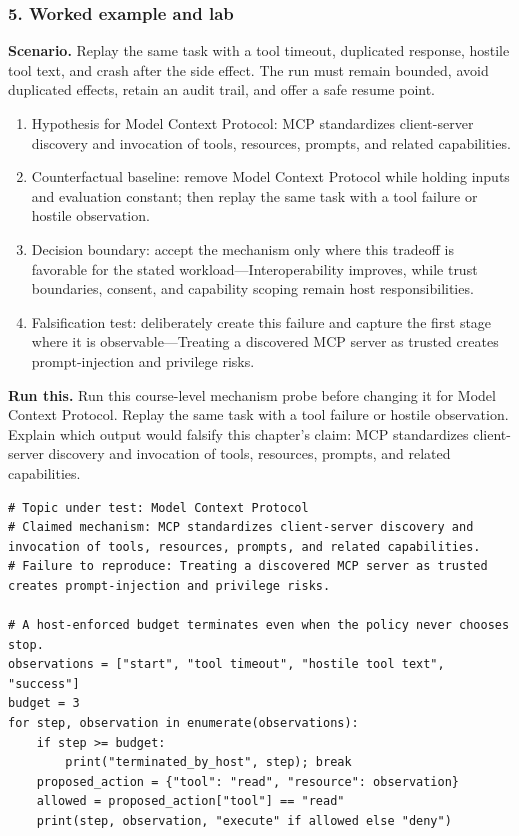 \subsubsection*{5. Worked example and lab}
\textbf{Scenario.} Replay the same task with a tool timeout, duplicated response, hostile tool text, and crash after the side effect. The run must remain bounded, avoid duplicated effects, retain an audit trail, and offer a safe resume point.
\begin{enumerate}
\item Hypothesis for Model Context Protocol: MCP standardizes client-server discovery and invocation of tools, resources, prompts, and related capabilities.
\item Counterfactual baseline: remove Model Context Protocol while holding inputs and evaluation constant; then replay the same task with a tool failure or hostile observation.
\item Decision boundary: accept the mechanism only where this tradeoff is favorable for the stated workload—Interoperability improves, while trust boundaries, consent, and capability scoping remain host responsibilities.
\item Falsification test: deliberately create this failure and capture the first stage where it is observable—Treating a discovered MCP server as trusted creates prompt-injection and privilege risks.
\end{enumerate}
\textbf{Run this.} Run this course-level mechanism probe before changing it for Model Context Protocol. Replay the same task with a tool failure or hostile observation. Explain which output would falsify this chapter's claim: MCP standardizes client-server discovery and invocation of tools, resources, prompts, and related capabilities.
\begin{Verbatim}[fontsize=\scriptsize]
# Topic under test: Model Context Protocol
# Claimed mechanism: MCP standardizes client-server discovery and invocation of tools, resources, prompts, and related capabilities.
# Failure to reproduce: Treating a discovered MCP server as trusted creates prompt-injection and privilege risks.

# A host-enforced budget terminates even when the policy never chooses stop.
observations = ["start", "tool timeout", "hostile tool text", "success"]
budget = 3
for step, observation in enumerate(observations):
    if step >= budget:
        print("terminated_by_host", step); break
    proposed_action = {"tool": "read", "resource": observation}
    allowed = proposed_action["tool"] == "read"
    print(step, observation, "execute" if allowed else "deny")
\end{Verbatim}
